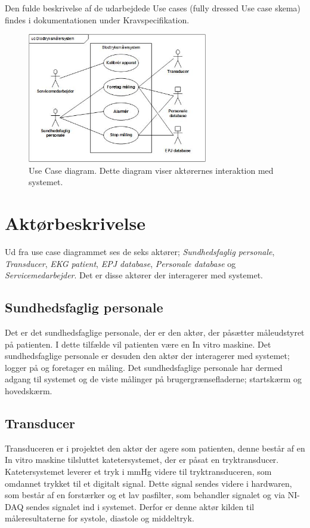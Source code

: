 Den fulde beskrivelse af de udarbejdede Use cases (fully dressed Use case skema) findes i dokumentationen under Kravspecifikation.
\begin{figure}[H]
\includegraphics[width =0.7\textwidth , center]{billeder/UseCaseDiagram}
\caption{Use Case diagram. Dette diagram viser aktørernes interaktion med systemet.}
\end{figure}
\section{Aktørbeskrivelse}
Ud fra use case diagrammet ses de seks aktører; \textit{Sundhedsfaglig personale}, \textit{Transducer}, \textit{EKG patient}, \textit{EPJ database}, \textit{Personale database} og \textit{Servicemedarbejder}. Det er disse aktører der interagerer med systemet.
\subsection{Sundhedsfaglig personale}
Det er det sundhedsfaglige personale, der er den aktør, der påsætter måleudstyret på patienten. I dette tilfælde vil patienten være en In vitro maskine. Det sundhedsfaglige personale er desuden den aktør der interagerer med systemet; logger på og foretager en måling. Det sundhedsfaglige personale har dermed adgang til systemet og de viste målinger på brugergrænsefladerne; startskærm og hovedskærm.
\subsection{Transducer}
Transduceren er i projektet den aktør der agere som patienten, denne består af en In vitro maskine tilsluttet katetersystemet, der er påsat en tryktransducer. Katetersystemet leverer et tryk i mmHg videre til tryktransduceren, som omdannet trykket til et digitalt signal. Dette signal sendes videre i hardwaren, som består af en forstærker og et lav pasfilter, som behandler signalet og via NI-DAQ sendes signalet ind i systemet. Derfor er denne aktør kilden til måleresultaterne for systole, diastole og middeltryk.
